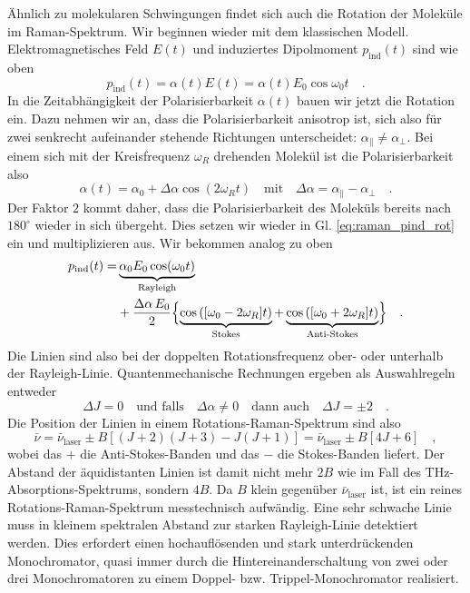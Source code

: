Ähnlich zu molekularen Schwingungen findet sich auch die Rotation der Moleküle im Raman-Spektrum. Wir beginnen wieder mit dem klassischen Modell. Elektromagnetisches Feld $E(t)$ und induziertes Dipolmoment $p_\text{ind}(t)$ sind wie oben
\begin{equation}
p_\text{ind}(t) = \alpha(t) E(t) = \alpha(t) E_0 \cos \omega_0 t \quad . \label{eq:raman_pind_rot}
\end{equation}
In die Zeitabhängigkeit der Polarisierbarkeit $\alpha(t)$ bauen wir jetzt die Rotation ein. Dazu nehmen wir an, dass die Polarisierbarkeit anisotrop ist, sich also für zwei senkrecht aufeinander stehende Richtungen unterscheidet: $\alpha_\parallel \neq \alpha_\perp$. Bei einem sich mit der Kreisfrequenz $\omega_R$ drehenden Molekül ist die Polarisierbarkeit also
\begin{equation}
\alpha(t) = \alpha_0 + \Delta \alpha \cos ( 2 \omega_R t) \quad \text{mit} \quad \Delta \alpha = \alpha_\parallel - \alpha_\perp \quad .
\end{equation}
Der Faktor $2$ kommt daher, dass die Polarisierbarkeit des Moleküls bereits nach $180^\circ$ wieder in sich übergeht. Dies setzen wir wieder in Gl. \ref{eq:raman_pind_rot} ein und multiplizieren aus. Wir bekommen analog zu oben
\begin{align}
p_\text{ind}(t) = & \underbrace{  \alpha_0 E_0 \cos(\omega_0 t) }_\text{Rayleigh} \\
& +   \frac{ \Delta \alpha \,  E_0 }{2} 
\Bigl\{ 
\underbrace{ \cos \left( [\omega_0 -2 \omega_R] t \right)}_\text{Stokes}  +  \underbrace{\cos \left( [\omega_0 + 2 \omega_R] t \right)  
}_\text{Anti-Stokes} 
\Bigr\}  \quad .
\nonumber
\end{align}
Die Linien sind also bei der doppelten Rotationsfrequenz ober- oder unterhalb der Rayleigh-Linie. Quantenmechanische Rechnungen ergeben als Auswahlregeln entweder
\begin{equation}
\Delta J = 0 \quad \text{und falls} \quad  \Delta \alpha \neq 0 \quad  \text{dann auch} \quad \Delta J = \pm 2 \quad .
\end{equation}
Die Position der Linien in einem Rotations-Raman-Spektrum sind also
\begin{equation}
 \bar{\nu} =  \bar{\nu}_\text{laser} \pm B \left[ (J+2) (J+3) - J(J+1) \right] = 
 \bar{\nu}_\text{laser} \pm B \left[ 4J + 6 \right] \quad ,
\end{equation}
wobei das $+$ die Anti-Stokes-Banden und das $-$ die Stokes-Banden liefert. Der Abstand der äquidistanten Linien ist damit nicht mehr $2B$ wie im Fall des THz-Absorptions-Spektrums, sondern $4B$. Da $B$ klein gegenüber $\bar{\nu}_\text{laser} $ ist, ist ein reines Rotations-Raman-Spektrum messtechnisch aufwändig. Eine sehr schwache Linie muss in kleinem spektralen Abstand zur starken Rayleigh-Linie detektiert werden. Dies erfordert einen hochauflösenden und stark unterdrückenden Monochromator, quasi immer durch die Hintereinanderschaltung von zwei oder drei Monochromatoren zu einem Doppel- bzw. Trippel-Monochromator realisiert.


